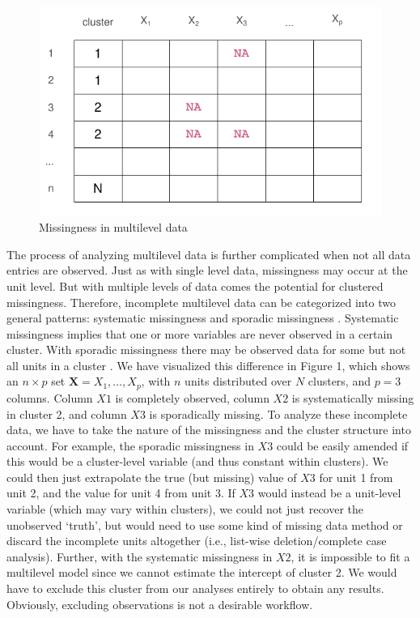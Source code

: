 \documentclass[
]{jss}
\begin{document}
\begin{CodeChunk}
\begin{figure}

{\centering \includegraphics{Imputation_of_Incomplete_Multilevel_Data_files/figure-latex/patterns-1} 

}

\caption[Missingness in multilevel data]{Missingness in multilevel data}\label{fig:patterns}
\end{figure}
\end{CodeChunk}

The process of analyzing multilevel data is further complicated when not
all data entries are observed. Just as with single level data,
missingness may occur at the unit level. But with multiple levels of
data comes the potential for clustered missingness. Therefore,
incomplete multilevel data can be categorized into two general patterns:
systematic missingness and sporadic missingness \citep{resc13}.
Systematic missingness implies that one or more variables are never
observed in a certain cluster. With sporadic missingness there may be
observed data for some but not all units in a cluster
\citep{buur18, jola18}. We have visualized this difference in Figure 1,
which shows an \(n \times p\) set \(\mathbf{X} = X_1, \dots, X_p\), with
\(n\) units distributed over \(N\) clusters, and \(p=3\) columns. Column
\(X1\) is completely observed, column \(X2\) is systematically missing
in cluster 2, and column \(X3\) is sporadically missing. To analyze
these incomplete data, we have to take the nature of the missingness and
the cluster structure into account. For example, the sporadic
missingness in \(X3\) could be easily amended if this would be a
cluster-level variable (and thus constant within clusters). We could
then just extrapolate the true (but missing) value of \(X3\) for unit 1
from unit 2, and the value for unit 4 from unit 3. If \(X3\) would
instead be a unit-level variable (which may vary within clusters), we
could not just recover the unobserved `truth', but would need to use
some kind of missing data method or discard the incomplete units
altogether (i.e., list-wise deletion/complete case analysis). Further,
with the systematic missingness in \(X2\), it is impossible to fit a
multilevel model since we cannot estimate the intercept of cluster 2. We
would have to exclude this cluster from our analyses entirely to obtain
any results. Obviously, excluding observations is not a desirable
workflow.
\end{document}

